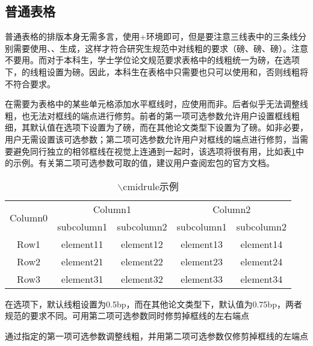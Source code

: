 \documentclass[print, doctor, vlined]{DissertUESTC}
\begin{document}
	\subsection{普通表格}
	
	普通表格的排版本身无需多言，使用+环境即可，但是要注意三线表中的三条线分别需要使用、、生成，这样才符合研究生规范中对线粗的要求（磅、磅、磅）。注意不要用。而对于本科生，学士学位论文规范要求表格中的线粗统一为磅，在选项下，的线粗设置为磅。因此，本科生在表格中只需要也只可以使用和，否则线粗将不符合要求。
	
	在需要为表格中的某些单元格添加水平框线时，应使用\newline{}而非。后者似乎无法调整线粗，也无法对框线的端点进行修剪。前者的第一项可选参数允许用户设置框线粗细，其默认值在选项下设置为了磅，而在其他论文类型下设置为了磅。如非必要，用户无需设置该可选参数；第二项可选参数允许用户对框线的端点进行修剪，当需要避免同行独立的相邻框线在视觉上连通到一起时，该选项将很有用，比如表\ref{tab: cmidrule示例}中的示例。有关第二项可选参数可取的值，建议用户查阅\href{https://mirrors.sustech.edu.cn/CTAN/macros/latex/contrib/booktabs/booktabs.pdf}{}宏包的官方文档。
	
	\begin{table}[htp]
		\caption{$\backslash$cmidrule示例}\label{tab: cmidrule示例}
		\begin{threeparttable}
			\begin{tabular}{ccccc}
				\toprule
				\multirow{2}{*}{Column0} &  \multicolumn{2}{c}{Column1\tnote{1}} & \multicolumn{2}{c}{Column2\tnote{2}} \\
				\cmidrule(lr){2-3}\cmidrule[2.5bp](l){4-5}
				~     & subcolumn1 & subcolumn2 & subcolumn1 & subcolumn2 \\
				\midrule
				Row1  & element11 & element12 &element13 & element14 \\
				Row2  & element21 & element22 &element23 & element24 \\
				\cmidrule{2-3}\cmidrule[2.5bp]{4-5}
				Row3  & element31 & element32 &element33 & element34 \\
				\bottomrule
			\end{tabular}
			\begin{tablenotes}
				\item[1] 在选项下，默认线粗设置为0.5bp，而在其他论文类型下，默认值为0.75bp，两者规范的要求不同。可用第二项可选参数同时修剪掉框线的左右端点
				\item[2] 通过指定的第一项可选参数调整线粗，并用第二项可选参数仅修剪掉框线的左端点
			\end{tablenotes}
		\end{threeparttable}
	\end{table}
\end{document}
